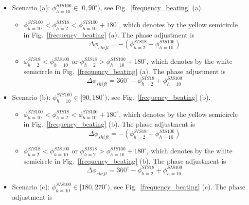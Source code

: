\begin{itemize}
    \item Scenario (a): $\phi_{h=10}^{SIS100}\in [0,90^\circ)$, see Fig.~\ref{frequency_beating} (a).

	\begin{itemize}
		\item $\phi_{h=10}^{SIS100}< \phi_{h=2}^{SIS18}< \phi_{h=10}^{SIS100} +180^\circ$, which denotes by the yellow semicircle in Fig.~\ref{frequency_beating} (a). The phase adjustment is
    \begin{equation}
			\Delta \phi_{shift}=-(\phi_{h=2}^{SIS18} - \phi_{h=10}^{SIS100})
    \end{equation}
    		\item $\phi_{h=2}^{SIS18} < \phi_{h=10}^{SIS100}$ or  $\phi_{h=2}^{SIS18} >\phi_{h=10}^{SIS100} +180^\circ$, which denotes by the white semicircle in Fig.~\ref{frequency_beating} (a). The phase adjustment is
    \begin{equation}
			\Delta \phi_{shift}= 360^\circ - \phi_{h=2}^{SIS18} + \phi_{h=10}^{SIS100}
    \end{equation}
	\end{itemize}
    \item Scenario (b): $\phi_{h=10}^{SIS100}\in [90,180^\circ)$, see Fig.~\ref{frequency_beating} (b). 

	\begin{itemize}
		\item $\phi_{h=10}^{SIS100}< \phi_{h=2}^{SIS18}< \phi_{h=10}^{SIS100} +180^\circ$, which denotes by the yellow semicircle in Fig.~\ref{frequency_beating} (b). The phase adjustment is
	    \begin{equation}		
\Delta \phi_{shift}=-(\phi_{h=2}^{SIS18} - \phi_{h=10}^{SIS100})
    \end{equation}
    		\item $\phi_{h=2}^{SIS18} < \phi_{h=10}^{SIS100}$ or  $\phi_{h=2}^{SIS18} >\phi_{h=10}^{SIS100} +180^\circ$, which denotes by the white semicircle in Fig.~\ref{frequency_beating} (b).  The phase adjustment is
    \begin{equation}			
\Delta \phi_{shift}=360^\circ - \phi_{h=2}^{SIS18} + \phi_{h=10}^{SIS100}
    \end{equation}
	\end{itemize}
    \item Scenario (c): $\phi_{h=10}^{SIS100}\in [180,270^\circ)$, see Fig.~\ref{frequency_beating} (c). The phase adjustment is


\end{itemize}
